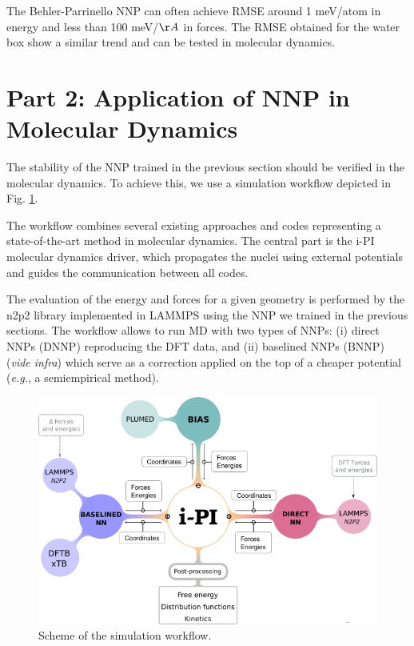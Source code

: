 \documentclass[12pt]{article}
\begin{document}
The Behler-Parrinello NNP can often achieve RMSE around 1 meV/atom in energy and less than 100 meV/$\AA$ in forces. The RMSE obtained for the water box show a similar trend and can be tested in molecular dynamics.

\newpage
{}
\section{Part 2: Application of NNP in Molecular Dynamics}
The stability of the NNP trained in the previous section should be verified in the molecular dynamics. To achieve this, we use a simulation workflow depicted in Fig. \ref{fig:workflow}. 

The workflow combines several existing approaches and codes representing a state-of-the-art method in molecular dynamics. The central part is the i-PI molecular dynamics driver, which propagates the nuclei using external potentials and guides the communication between all codes. 

The evaluation of the energy and forces for a given geometry is performed by the n2p2 library implemented in LAMMPS using the NNP we trained in the previous sections. The workflow allows to run MD with two types of NNPs: (i) direct NNPs (DNNP) reproducing the DFT data, and (ii) baselined NNPs (BNNP) (\textit{vide infra}) which serve as a correction applied on the top of a cheaper potential (\textit{e.g.}, a semiempirical method). 

\begin{figure}[!htp]
    \centering
    \includegraphics[scale=0.8]{latex_files/diagram_general.png}
    \caption{Scheme of the simulation workflow.}
    \label{fig:workflow}
\end{figure}
\end{document}

